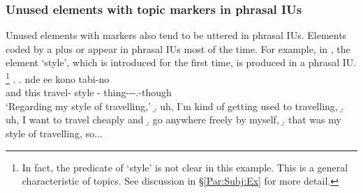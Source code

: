 %


\subsubsection{Unused elements with topic markers in phrasal IUs}\label{Int:Cor:InacTopic:PIU}

Unused elements with  markers also tend to be uttered in
phrasal IUs.
Elements coded by a  plus  or  appear
in phrasal IUs most of the time.
For example, in \Next[a],
the element  `style', which is introduced for the first time,
is produced in a phrasal IU.%
	\footnote{
	In fact, the predicate of `style' is not clear in this example.
	This is a general characteristic of topics.
	See discussion in \S \ref{Par:Subj:Ex} for more detail.
	}
%
\ex.
 \ag. nde {\iub} ee {\iub} kono {\iub} tabi-no {\iub}  {\iub}   {\iub} \\
      and {}  {} this {} travel- {} style {} - thing---.-though \\
      `Regarding my style of travelling,'
 \b. uh, I'm kind of getting used to travelling,
 \b. uh, I want to travel cheaply and
 \b. go anywhere freely by myself,
 \b. that was my style of travelling, so...

